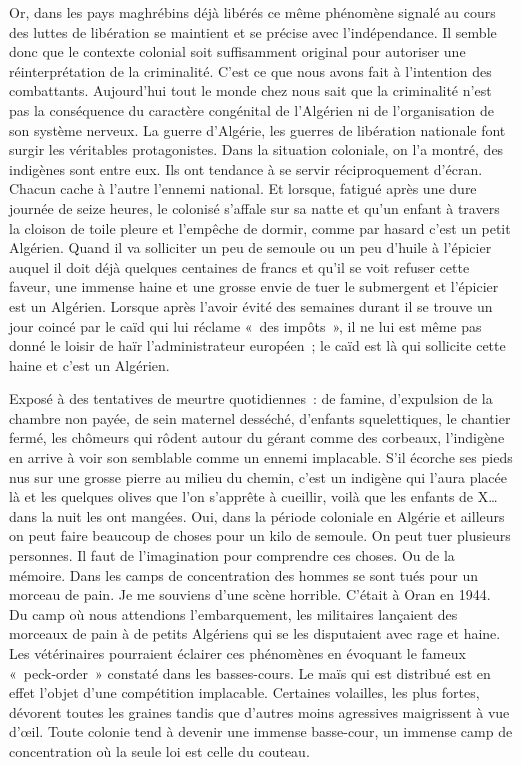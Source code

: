 \documentclass[french,twoside]{book} %
\begin{document}
Or, dans les pays maghrébins déjà libérés ce même phénomène signalé au cours des luttes de libération se maintient et se précise avec l’indépendance. Il semble donc que le contexte colonial soit suffisamment original pour autoriser une réinterprétation de la criminalité. C’est ce que nous avons fait à l’intention des combattants. Aujourd’hui tout le monde chez nous sait que la criminalité n’est pas la conséquence du caractère congénital de l’Algérien ni de l’organisation de son système   nerveux. La guerre d’Algérie, les guerres de libération nationale font surgir les véritables protagonistes. Dans la situation coloniale, on l’a montré, des indigènes sont entre eux. Ils ont tendance à se servir réciproquement d’écran. Chacun cache à l’autre l’ennemi national. Et lorsque, fatigué après une dure journée de seize heures, le colonisé s’affale sur sa natte et qu’un enfant à travers la cloison de toile pleure et l’empêche de dormir, comme par hasard c’est un petit Algérien. Quand il va solliciter un peu de semoule ou un peu d’huile à l’épicier auquel il doit déjà quelques centaines de francs et qu’il se voit refuser cette faveur, une immense haine et une grosse envie de tuer le submergent et l’épicier est un Algérien. Lorsque après l’avoir évité des semaines durant il se trouve un jour coincé par le caïd qui lui réclame « des impôts », il ne lui est même pas donné le loisir de haïr l’administrateur européen ; le caïd est là qui sollicite cette haine et c’est un Algérien.\par
Exposé à des tentatives de meurtre quotidiennes : de famine, d’expulsion de la chambre non payée, de sein maternel desséché, d’enfants squelettiques, le chantier fermé, les chômeurs qui rôdent autour du gérant comme des corbeaux, l’indigène en arrive à voir son semblable comme un ennemi implacable. S’il écorche ses pieds nus sur une grosse pierre au milieu du chemin, c’est un indigène qui l’aura placée là et les quelques olives que l’on s’apprête à cueillir, voilà que les enfants de X… dans la nuit les ont mangées. Oui, dans la période coloniale en Algérie et ailleurs on peut faire beaucoup de choses pour un kilo de semoule. On peut tuer plusieurs personnes. Il faut de l’imagination pour comprendre ces choses. Ou de la mémoire. Dans les camps de concentration des hommes se sont tués pour un morceau de pain. Je me souviens d’une scène horrible. C’était à Oran en 1944. Du camp où nous attendions l’embarquement, les militaires lançaient des morceaux de pain à de petits Algériens qui se les disputaient avec rage et haine. Les vétérinaires pourraient éclairer ces phénomènes en évoquant le fameux « peck-order » constaté dans les basses-cours. Le maïs qui est distribué est en effet l’objet d’une compétition implacable. Certaines   volailles, les plus fortes, dévorent toutes les graines tandis que d’autres moins agressives maigrissent à vue d’œil. Toute colonie tend à devenir une immense basse-cour, un immense camp de concentration où la seule loi est celle du couteau.\par
\end{document}
